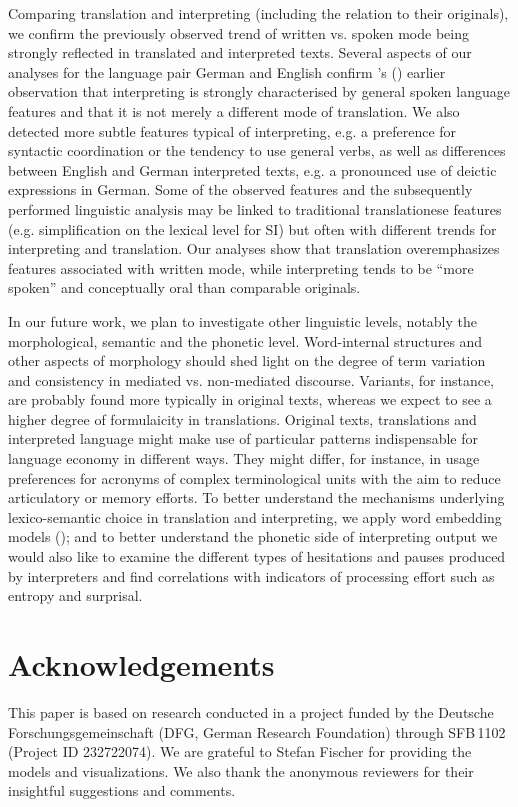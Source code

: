 \documentclass[output=paper,colorlinks,citecolor=brown]{langscibook}
\begin{document}
Comparing translation and interpreting (including the relation to their originals), we confirm the previously observed trend of written vs. spoken mode being strongly reflected in translated and interpreted texts. Several aspects of our analyses for the language pair German and English confirm \citeauthor{ShlesingerOrdan2012}'s (\citeyear{ShlesingerOrdan2012}) earlier observation that interpreting is strongly characterised by general spoken language features and that it is not merely a different mode of translation.
We also detected more subtle features typical of interpreting, e.g. a preference for syntactic coordination or the tendency to use general verbs, as well as differences between English and German interpreted texts, e.g. a pronounced use of deictic expressions in German.
Some of the observed features and the subsequently performed linguistic analysis may be linked to traditional translationese features (e.g. simplification on the lexical level for SI) but often with different trends for interpreting and translation. Our analyses show that translation overemphasizes features associated with written mode, while interpreting tends to be ``more spoken'' and conceptually oral than comparable originals.


\largerpage
In our future work, we plan to investigate other linguistic levels, notably the morphological, semantic and the phonetic level. Word-internal structures and other aspects of morphology should shed light on the degree of term variation and consistency in mediated vs. non-mediated discourse. Variants, for instance, are probably found more typically in original texts, whereas we expect to see a higher degree of formulaicity in translations. Original texts, translations and interpreted language might make use of particular patterns indispensable for language economy in different ways. They might differ, for instance, in usage preferences for acronyms of complex terminological units with the aim to reduce articulatory or memory efforts. To better understand the mechanisms underlying lexico-semantic choice in translation and interpreting, we apply word embedding models (\citealt{BizzoniTeich2019}); and to better understand the phonetic side of interpreting output we would also like to examine the different types of hesitations and pauses produced by interpreters and find correlations with indicators of processing effort such as entropy and surprisal.



\section*{Acknowledgements}
This paper is based on research conducted in a project funded by the Deutsche Forschungsgemeinschaft (DFG, German Research Foundation) through SFB\,1102 (Project ID 232722074). We are grateful to Stefan Fischer for providing the models and visualizations. We also thank the anonymous reviewers for their insightful suggestions and comments. 


\printbibliography[heading=subbibliography,notkeyword=this]
\end{document}
